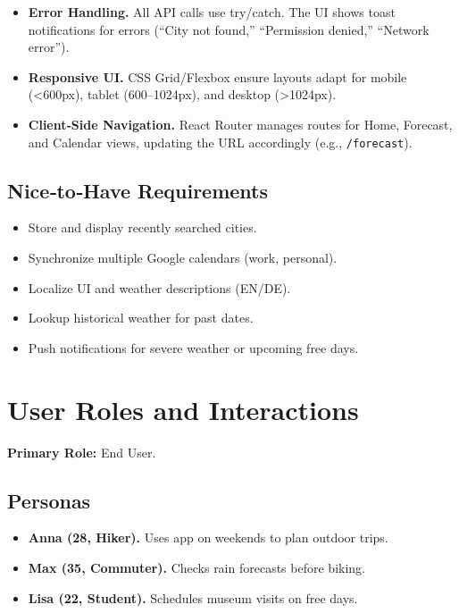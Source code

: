 \documentclass[12pt,a4paper]{article}
\begin{document}
\begin{itemize}[nosep]
  \item \textbf{Error Handling.}  
    All API calls use try/catch. The UI shows toast notifications for errors
    (“City not found,” “Permission denied,” “Network error”).

  \item \textbf{Responsive UI.}  
    CSS Grid/Flexbox ensure layouts adapt for mobile (<600px), tablet (600–1024px),
    and desktop (>1024px).

  \item \textbf{Client‐Side Navigation.}  
    React Router manages routes for Home, Forecast, and Calendar views,
    updating the URL accordingly (e.g., \texttt{/forecast}).
\end{itemize}

\subsection*{Nice‐to‐Have Requirements}
\begin{itemize}[nosep]
  \item Store and display recently searched cities.
  \item Synchronize multiple Google calendars (work, personal).
  \item Localize UI and weather descriptions (EN/DE).
  \item Lookup historical weather for past dates.
  \item Push notifications for severe weather or upcoming free days.
\end{itemize}



\section{User Roles and Interactions}
\textbf{Primary Role:} End User.

\subsection*{Personas}
\begin{itemize}[nosep]
  \item \textbf{Anna (28, Hiker).} Uses app on weekends to plan outdoor trips.
  \item \textbf{Max (35, Commuter).} Checks rain forecasts before biking.
  \item \textbf{Lisa (22, Student).} Schedules museum visits on free days.
\end{itemize}
\end{document}
